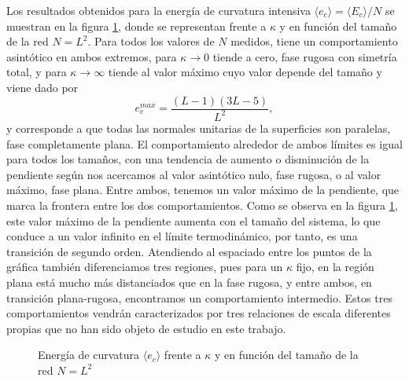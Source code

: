 Los resultados obtenidos para la energía de curvatura intensiva $\langle
e_c\rangle=\langle E_c\rangle/N$ se muestran en la figura \ref{Ec_fig}, donde
se representan frente a $\kappa$ y en función del tamaño de la red
$N=L^2$. Para todos los valores de $N$ medidos, tiene un comportamiento
asintótico en ambos extremos, para $\kappa\rightarrow 0$ tiende a cero, fase
rugosa con simetría total, y para $\kappa\rightarrow \infty$ tiende al valor
máximo cuyo valor depende del tamaño y viene dado por 
\begin{equation}
e^{max}_c = \frac{(L-1)(3L-5)}{L^2},
\end{equation}
y corresponde a que todas las normales unitarias de la superficies son
paralelas, fase completamente plana. El comportamiento alrededor de ambos
límites es igual para todos los tamaños, con una tendencia de aumento o
disminución de la pendiente según nos acercamos al valor asintótico nulo, fase
rugosa, o al valor máximo, fase plana. Entre ambos, tenemos un valor máximo de
la pendiente, que marca la frontera entre los dos comportamientos. Como se
observa en la figura \ref{Ec_fig}, este valor máximo de la pendiente aumenta
con el tamaño del sistema, lo que conduce a un valor infinito en el límite
termodinámico, por tanto, es una transición de segundo orden. Atendiendo al
espaciado entre los puntos de la gráfica también diferenciamos tres regiones, pues para un
$\kappa$ fijo, en la región plana está mucho más distanciados que en la fase
rugosa, y entre ambos, en transición plana-rugosa, encontramos un
comportamiento intermedio. Estos tres comportamientos vendrán caracterizados por tres
relaciones de escala diferentes propias que no han sido objeto de estudio en
este trabajo.

\begin{figure}[h]
\centering
 
\caption{Energía de curvatura $\langle e_c\rangle$ frente a $\kappa$ y en función del tamaño de la red
$N=L^2$}\label{Ec_fig}
\end{figure}

